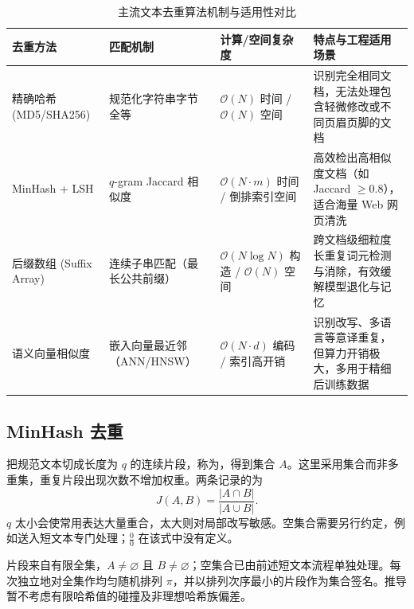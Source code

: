 \documentclass[../textbook.tex]{subfiles}
\begin{document}
\begin{table}[htbp]
\centering
\caption{主流文本去重算法机制与适用性对比}
\label{tab:dedup-comparison}
\begin{tabularx}{\linewidth}{lp{28mm}p{25mm}X}
\toprule
去重方法 & 匹配机制 & 计算/空间复杂度 & 特点与工程适用场景 \\
\midrule
精确哈希 (MD5/SHA256) & 规范化字符串字节全等 & $\mathcal{O}(N)$ 时间 / $\mathcal{O}(N)$ 空间 & 识别完全相同文档，无法处理包含轻微修改或不同页眉页脚的文档 \\
MinHash + LSH & $q$-gram Jaccard 相似度 & $\mathcal{O}(N \cdot m)$ 时间 / 倒排索引空间 & 高效检出高相似度文档（如 Jaccard $\ge 0.8$），适合海量 Web 网页清洗 \\
后缀数组 (Suffix Array) & 连续子串匹配（最长公共前缀） & $\mathcal{O}(N \log N)$ 构造 / $\mathcal{O}(N)$ 空间 & 跨文档级细粒度长重复词元检测与消除，有效缓解模型退化与记忆 \\
语义向量相似度 & 嵌入向量最近邻（ANN/HNSW） & $\mathcal{O}(N \cdot d)$ 编码 / 索引高开销 & 识别改写、多语言等意译重复，但算力开销极大，多用于精细后训练数据 \\
\bottomrule
\end{tabularx}
\end{table}

\subsection{MinHash 去重}
把规范文本切成长度为 $q$ 的连续片段，称为，得到集合 $A$。这里采用集合而非多重集，重复片段出现次数不增加权重。两条记录的为
\begin{equation}
J(A,B)=\frac{|A\cap B|}{|A\cup B|}.
\end{equation}
$q$ 太小会使常用表达大量重合，太大则对局部改写敏感。空集合需要另行约定，例如送入短文本专门处理；$\frac{0}{0}$ 在该式中没有定义。

\begin{assumption}[最小哈希的理想化模型]
片段来自有限全集，$A\ne\varnothing$ 且 $B\ne\varnothing$；空集合已由前述短文本流程单独处理。每次独立地对全集作均匀随机排列 $\pi$，并以排列次序最小的片段作为集合签名。推导暂不考虑有限哈希值的碰撞及非理想哈希族偏差。
\end{assumption}
\end{document}
